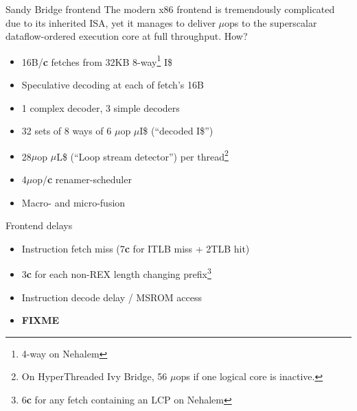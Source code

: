 \documentclass[xcolor={dvipsnames,table}]{beamer}
\begin{document}
\begin{frame}{Sandy Bridge frontend}
The modern x86 frontend is tremendously complicated due to its inherited ISA,
yet it manages to deliver $\mu$ops to the superscalar dataflow-ordered
execution core at full throughput. How?
\vfill
\begin{itemize}
\item 16B/\textbf{c} fetches from 32KB 8-way\footnote{4-way on Nehalem} I\$
\item Speculative decoding at each of fetch's 16B
\item 1 complex decoder, 3 simple decoders
\item 32 sets of 8 ways of 6 $\mu$op $\mu$I\$ (``decoded I\$'')
\item 28$\mu$op $\mu$L\$ (``Loop stream detector'') per thread\footnote{On HyperThreaded Ivy Bridge, 56 $\mu$ops if one logical core is inactive.}
\item 4$\mu$op/\textbf{c} renamer-scheduler
\item Macro- and micro-fusion
\end{itemize}
\end{frame}

\begin{frame}{Frontend delays}
\begin{itemize}
\item Instruction fetch miss (7\textbf{c} for ITLB miss + 2TLB hit)
\item 3\textbf{c} for each non-REX length changing prefix\footnote{6\textbf{c} for any fetch containing an LCP on Nehalem}
\item Instruction decode delay / MSROM access
\item \huge\textbf{FIXME}
\end{itemize}
\end{frame}
\end{document}
